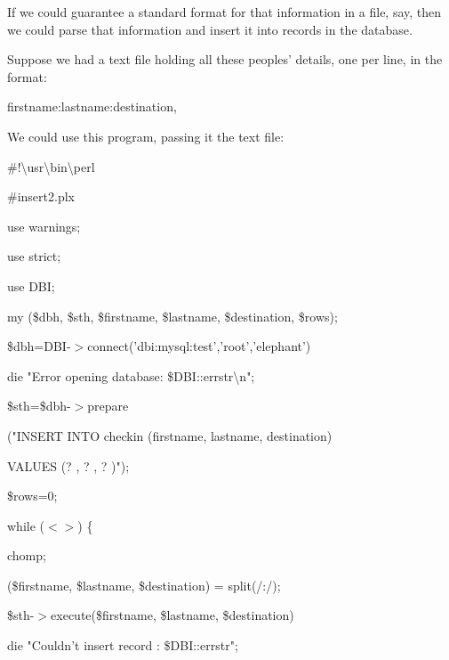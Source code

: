 \documentclass[a4paper,11pt]{book}
\begin{document}
\noindent 

\noindent If we could guarantee a standard format for that information in a file, say, then we could parse that information and insert it into records in the database.

\noindent 

\noindent Suppose we had a text file holding all these peoples' details, one per line, in the format:

\noindent 

\noindent firstname:lastname:destination,

\noindent 

\noindent 

\noindent We could use this program, passing it the text file:

\noindent 

\noindent 

\noindent \#!\textbackslash usr\textbackslash bin\textbackslash perl

\noindent \#insert2.plx

\noindent 

\noindent use warnings;

\noindent use strict;

\noindent use DBI;

\noindent 

\noindent my (\$dbh, \$sth, \$firstname, \$lastname, \$destination, \$rows);

\noindent 

\noindent \$dbh=DBI-$>$connect('dbi:mysql:test','root','elephant') \textbar \textbar 

\noindent die "Error opening database: \$DBI::errstr\textbackslash n";

\noindent 

\noindent \$sth=\$dbh-$>$prepare

\noindent ("INSERT INTO checkin (firstname, lastname, destination)

\noindent VALUES (? , ? , ? )");

\noindent 

\noindent \$rows=0;

\noindent 

\noindent while ($<$$>$) \{

\noindent chomp;

\noindent (\$firstname, \$lastname, \$destination) = split(/:/);

\noindent \$sth-$>$execute(\$firstname, \$lastname, \$destination)

\noindent \textbar \textbar  die "Couldn't insert record : \$DBI::errstr";
\end{document}
